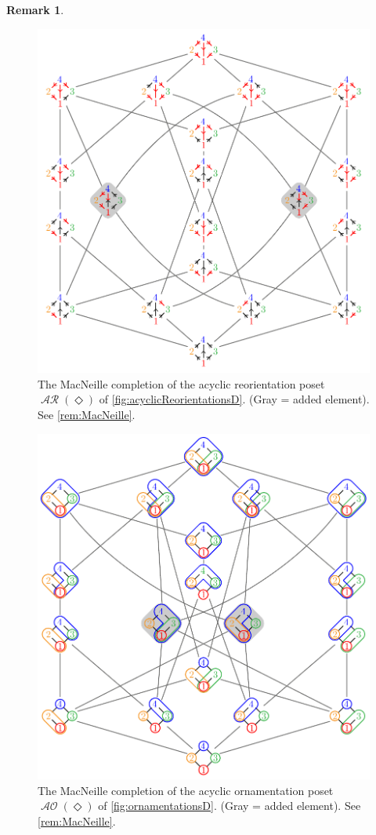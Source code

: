 \documentclass{amsart}
\theoremstyle{definition}
\newtheorem{remark}[theorem]{Remark}
\renewcommand{\c}[1]{\mathcal{#1}} %
\DeclareMathOperator{\AOrn}{\c{AO}}  %
\DeclareMathOperator{\AReori}{\c{AR}}  %
\newcommand{\Dgraph}{\boldsymbol{\Diamond}} %
\begin{document}
\begin{remark}
\begin{figure}
	\centerline{\includegraphics[scale=.68]{MacNeilleAcyclicReorientationsD}}
	\caption{The MacNeille completion of the acyclic reorientation poset~$\AReori(\Dgraph)$ of \cref{fig:acyclicReorientationsD}. (Gray = added element). See \cref{rem:MacNeille}.}
	\label{fig:MacNeilleAcyclicReorientationsD}
\end{figure}
%
\begin{figure}
	\centerline{\includegraphics[scale=.68]{MacNeilleAcyclicOrnamentationsD}}
	\caption{The MacNeille completion of the acyclic ornamentation poset~$\AOrn(\Dgraph)$ of \cref{fig:ornamentationsD}. (Gray = added element). See \cref{rem:MacNeille}.}
	\label{fig:MacNeilleAcyclicOrnamentationsD}
\end{figure}
\end{remark}
\end{document}
